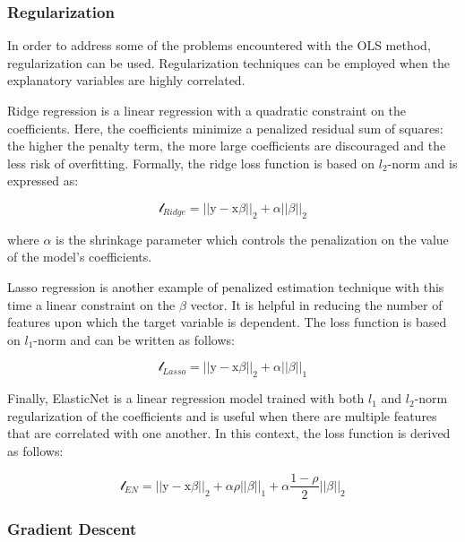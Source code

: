 \documentclass[
]{book}
\begin{document}
\hypertarget{regularization}{%
\subsubsection*{Regularization}\label{regularization}}

In order to address some of the problems encountered with the OLS method, regularization can be used. Regularization techniques can be employed when the explanatory variables are highly correlated.

Ridge regression is a linear regression with a quadratic constraint on the coefficients. Here, the coefficients minimize a penalized residual sum of squares: the higher the penalty term, the more large coefficients are discouraged and the less risk of overfitting. Formally, the ridge loss function is based on \(l_2\)-norm and is expressed as:

\begin{equation}
  \mathcal{l}_{Ridge} = ||\mathrm{y} - \pmb{\mathrm{x}}\beta||_2 + \alpha ||\beta||_2
  \label{eq:ridge}
\end{equation}

where \(\alpha\) is the shrinkage parameter which controls the penalization on the value of the model's coefficients.

Lasso regression is another example of penalized estimation technique with this time a linear constraint on the \(\beta\) vector. It is helpful in reducing the number of features upon which the target variable is dependent. The loss function is based on \(l_1\)-norm and can be written as follows:

\begin{equation}
  \mathcal{l}_{Lasso} = ||\mathrm{y} - \pmb{\mathrm{x}}\beta||_2 + \alpha ||\beta||_1
  \label{eq:lasso}
\end{equation}

Finally, ElasticNet is a linear regression model trained with both \(l_1\) and \(l_2\)-norm regularization of the coefficients and is useful when there are multiple features that are correlated with one another. In this context, the loss function is derived as follows:

\begin{equation}
  \mathcal{l}_{EN} = ||\mathrm{y} - \pmb{\mathrm{x}}\beta||_2 + \alpha \rho ||\beta||_1 + \alpha \frac{1-\rho}{2} ||\beta||_2
  \label{eq:elasticnet}
\end{equation}

\hypertarget{gradient-descent}{%
\subsubsection*{Gradient Descent}\label{gradient-descent}}
\end{document}

